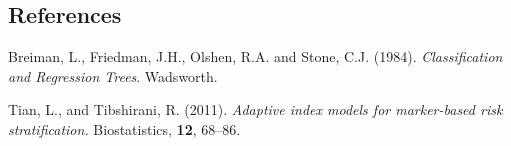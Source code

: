 \documentclass[12pt]{article}
\begin{document}
\subsection*{References}

\baselineskip 5mm
\begin{description}
\item
Breiman, L., Friedman, J.H., Olshen, R.A. and Stone, C.J. (1984).
\textit{Classification and Regression Trees}. Wadsworth.

\item
Tian, L., and Tibshirani, R. (2011).
\textit{Adaptive index models for marker-based risk stratification.}
Biostatistics, {\bf 12}, 68--86.





\end{description}
\end{document}
